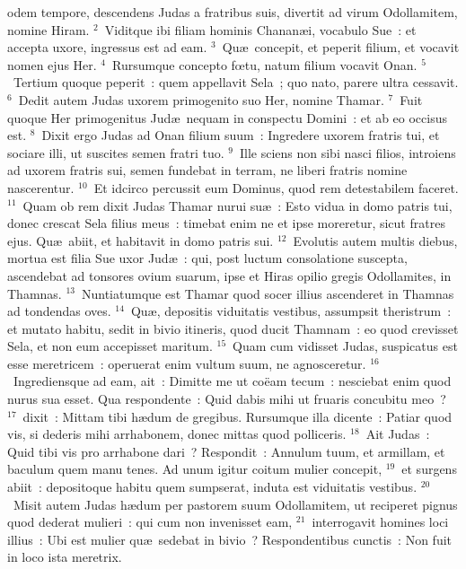 \bchapter
{}odem tempore, descendens Judas a fratribus suis, divertit ad virum Odollamitem, nomine Hiram.
${}^{2}$~Viditque ibi filiam hominis Chanan\ae i, vocabulo Sue~: et accepta uxore, ingressus est ad eam.
${}^{3}$~Qu\ae\ concepit, et peperit filium, et vocavit nomen ejus Her.
${}^{4}$~Rursumque concepto fœtu, natum filium vocavit Onan.
${}^{5}$~Tertium quoque peperit~: quem appellavit Sela~; quo nato, parere ultra cessavit.
${}^{6}$~Dedit autem Judas uxorem primogenito suo Her, nomine Thamar.
${}^{7}$~Fuit quoque Her primogenitus Jud\ae\ nequam in conspectu Domini~: et ab eo occisus est.
${}^{8}$~Dixit ergo Judas ad Onan filium suum~: Ingredere uxorem fratris tui, et sociare illi, ut suscites semen fratri tuo.
${}^{9}$~Ille sciens non sibi nasci filios, introiens ad uxorem fratris sui, semen fundebat in terram, ne liberi fratris nomine nascerentur.
${}^{10}$~Et idcirco percussit eum Dominus, quod rem detestabilem faceret.
${}^{11}$~Quam ob rem dixit Judas Thamar nurui su\ae~: Esto vidua in domo patris tui, donec crescat Sela filius meus~: timebat enim ne et ipse moreretur, sicut fratres ejus. Qu\ae\ abiit, et habitavit in domo patris sui.
${}^{12}$~Evolutis autem multis diebus, mortua est filia Sue uxor Jud\ae~: qui, post luctum consolatione suscepta, ascendebat ad tonsores ovium suarum, ipse et Hiras opilio gregis Odollamites, in Thamnas.
${}^{13}$~Nuntiatumque est Thamar quod socer illius ascenderet in Thamnas ad tondendas oves.
${}^{14}$~Qu\ae , depositis viduitatis vestibus, assumpsit theristrum~: et mutato habitu, sedit in bivio itineris, quod ducit Thamnam~: eo quod crevisset Sela, et non eum accepisset maritum.
${}^{15}$~Quam cum vidisset Judas, suspicatus est esse meretricem~: operuerat enim vultum suum, ne agnosceretur.
${}^{16}$~Ingrediensque ad eam, ait~: Dimitte me ut co\"eam tecum~: nesciebat enim quod nurus sua esset. Qua respondente~: Quid dabis mihi ut fruaris concubitu meo~?
${}^{17}$~dixit~: Mittam tibi h\ae dum de gregibus. Rursumque illa dicente~: Patiar quod vis, si dederis mihi arrhabonem, donec mittas quod polliceris.
${}^{18}$~Ait Judas~: Quid tibi vis pro arrhabone dari~? Respondit~: Annulum tuum, et armillam, et baculum quem manu tenes. Ad unum igitur coitum mulier concepit,
${}^{19}$~et surgens abiit~: depositoque habitu quem sumpserat, induta est viduitatis vestibus.
${}^{20}$~Misit autem Judas h\ae dum per pastorem suum Odollamitem, ut reciperet pignus quod dederat mulieri~: qui cum non invenisset eam,
${}^{21}$~interrogavit homines loci illius~: Ubi est mulier qu\ae\ sedebat in bivio~? Respondentibus cunctis~: Non fuit in loco ista meretrix.

